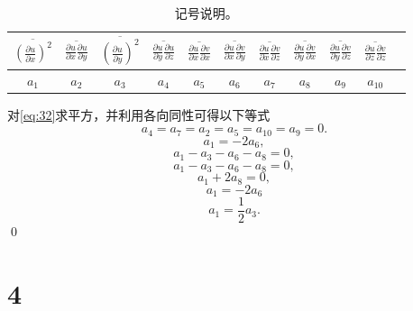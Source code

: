 \documentclass[12pt,a4]{ctexart}
\begin{document}
\begin{table}[htpb]
   \centering
   \caption{记号说明。}
   \label{tab:31}
   \begin{tabular}{ccccccccccc}
	  \toprule
	  $\overline{\left(\frac{\partial u}{\partial x}\right)^{2}}$
	   & $\overline{ \frac{\partial u}{\partial x} \frac{\partial u}{\partial y} }$
	   & $\overline{{\left(\frac{\partial u}{\partial y}\right)}^{2} }$
	   & $\overline{  \frac{\partial u}{\partial y} \frac{\partial u}{\partial z} }$
	   & $\overline{ \frac{\partial u}{\partial x} \frac{\partial v}{\partial x} }$
	   & $ \overline{\frac{\partial u}{\partial x} \frac{\partial v}{\partial y}} $
	   & $ \overline{\frac{\partial u}{\partial x} \frac{\partial v}{\partial z}}$
	   & $\overline{ \frac{\partial u}{\partial y} \frac{\partial v}{\partial x} }$
	   & $\overline{ \frac{\partial u}{\partial y} \frac{\partial v}{\partial z} }$
	   & $\overline{ \frac{\partial u}{\partial z} \frac{\partial v}{\partial z}}$   \\
	   \midrule
	   $a_{1} $
	   & $ a_{2} $
	   & $ a_{3} $
	   & $ a_{4} $
	   & $ a_{5} $
	   & $ a_{6} $
	   & $ a_{7} $
	   & $ a_{8} $
	   & $ a_{9} $
	   & $ a_{10}$\\
	   \bottomrule
   \end{tabular}
\end{table}
对\cref{eq:32}求平方，并利用各向同性可得以下等式
\begin{equation}
   a_4 = a_7 = a_2 = a_5 = a_{10} = a_9 = 0.
\end{equation}
\begin{equation}
   a_1 = - 2a_6,
\end{equation}
\begin{equation}
   a_1 - a_3 - a_6 - a_8 = 0,
\end{equation}
\begin{equation}
   a_1 - a_3 - a_6 - a_8 = 0,
\end{equation}
\begin{equation}
   a_1 + 2a_8 = 0,
\end{equation}
\begin{equation}
   a_1 = - 2a_6
\end{equation}
\begin{equation}
   a_1 = \frac{1}{2} a_3.
\end{equation}
\qed


\section{4}
\end{document}
